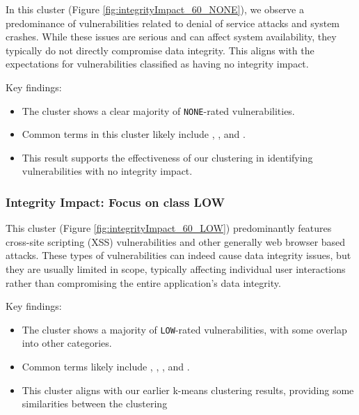 \documentclass[12pt]{article}
\begin{document}
In this cluster (Figure \ref{fig:integrityImpact_60_NONE}), we observe a predominance of
vulnerabilities related to denial of service attacks and system crashes. While these issues are
serious and can affect system availability, they typically do not directly compromise data
integrity. This aligns with the expectations for vulnerabilities classified as having no integrity
impact.

Key findings:
\begin{itemize}

	\item The cluster shows a clear majority of \texttt{NONE}-rated vulnerabilities.

	\item Common terms in this cluster likely include , , and
	      .

	\item This result supports the effectiveness of our clustering in identifying vulnerabilities
	      with no integrity impact.

\end{itemize}

\subsubsection{Integrity Impact: Focus on class LOW}

This cluster (Figure \ref{fig:integrityImpact_60_LOW}) predominantly features cross-site scripting (XSS) vulnerabilities and other generally
web browser based attacks. These types of vulnerabilities can indeed cause data integrity issues, but
they are usually limited in scope, typically affecting individual user interactions rather than
compromising the entire application's data integrity.

Key findings:
\begin{itemize}

	\item The cluster shows a majority of \texttt{LOW}-rated vulnerabilities, with some overlap into
	      other categories.

	\item Common terms likely include , , , and .

	\item This cluster aligns with our earlier k-means clustering results, providing some
	      similarities between the clustering
\end{itemize}
\end{document}
